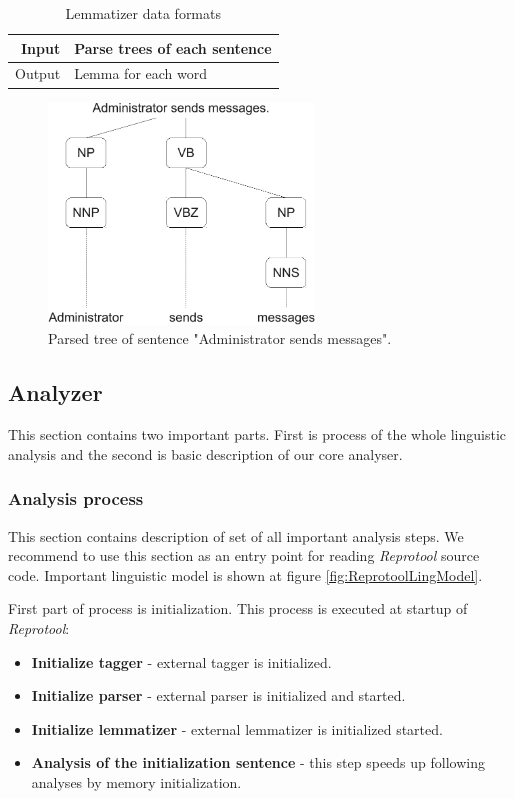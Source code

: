 \begin{table}[ht]   %
\begin{center}
  \begin{tabular}{| r | l |}
\hline
Input 	& Parse trees of each sentence \\ \hline
Output 	& Lemma for each word \\ 
\hline
  \end{tabular}
  \caption{Lemmatizer data formats}
  \label{tab.lemmatizer}
\end{center}
\end{table} 


\begin{figure}[ht]
  \centering
  \includegraphics[width=200pt]{images/ParsedTree}
  \caption{Parsed tree of sentence "Administrator sends messages".}
  \label{fig:ParsedTree}
\end{figure}

\subsection{Analyzer}
\label{sec:analyzer}
This section contains two important parts. First is process of the whole linguistic analysis and the second is basic description of our core analyser.

\subsubsection{Analysis process}
This section contains description of set of all important analysis steps. We recommend to use this section as an entry point for reading \emph{Reprotool} source code.
Important linguistic model is shown at figure \ref{fig:ReprotoolLingModel}. 

First part of process is initialization. This process is executed at startup of \emph{Reprotool}:

\begin{itemize}
\item {\bf Initialize tagger} - external tagger is initialized.
\item {\bf Initialize parser} - external parser is initialized and started.
\item {\bf Initialize lemmatizer} - external lemmatizer is initialized started.
\item {\bf Analysis of the initialization sentence} - this step speeds up following analyses by memory initialization.
\end{itemize}

